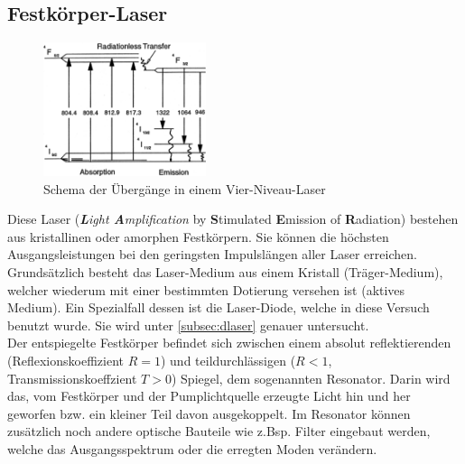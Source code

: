 \documentclass[numbers=noenddot,12pt,a4paper]{scrartcl}
\newcommand{\tilt}[1]{\textit{#1}}
\begin{document}
\subsection{Festkörper-Laser}\label{subsec:fklaser}
\begin{figure}
	\centering
	\includegraphics[width=0.425\textwidth]{uebergaenge.png}
	\caption{Schema der Übergänge in einem Vier-Niveau-Laser}\label{img:ueber}
\end{figure}
Diese Laser (\tilt{\textbf{L}ight \textbf{A}mplification} by \textbf{S}timulated \textbf{E}mission of \textbf{R}adiation) bestehen aus kristallinen oder amorphen Festkörpern. Sie können die höchsten Ausgangsleistungen bei den geringsten Impulslängen aller Laser erreichen. Grundsätzlich besteht das Laser-Medium aus einem Kristall (Träger-Medium), welcher wiederum mit einer bestimmten Dotierung versehen ist (aktives Medium). Ein Spezialfall dessen ist die Laser-Diode, welche in diese Versuch benutzt wurde. Sie wird unter \ref{subsec:dlaser} genauer untersucht.\\
Der entspiegelte Festkörper befindet sich zwischen einem absolut reflektierenden (Reflexionskoeffizient $R=1$) und teildurchlässigen ($R<1$, Transmissionskoeffzient $T>0$) Spiegel, dem sogenannten Resonator. Darin wird das, vom Festkörper und der Pumplichtquelle erzeugte Licht hin und her geworfen bzw. ein kleiner Teil davon ausgekoppelt. Im Resonator können zusätzlich noch andere optische Bauteile wie z.Bsp. Filter eingebaut werden, welche das Ausgangsspektrum oder die erregten Moden verändern.\\
\end{document}
